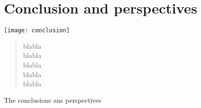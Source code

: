 \chapter{Conclusion and perspectives} \label{chap:conclusion}
\vspace{2cm}

\begin{minipage}[c]{0.45\linewidth}
\texttt{[image: conclusion]}
\end{minipage}
\hfill
\begin{minipage}[c]{0.45\linewidth}
\begin{abstract}
blabla\\
blabla\\
blabla\\
blabla\\
blabla\\
\end{abstract}
\end{minipage}

\newpage
The conclusions ans perspectives

